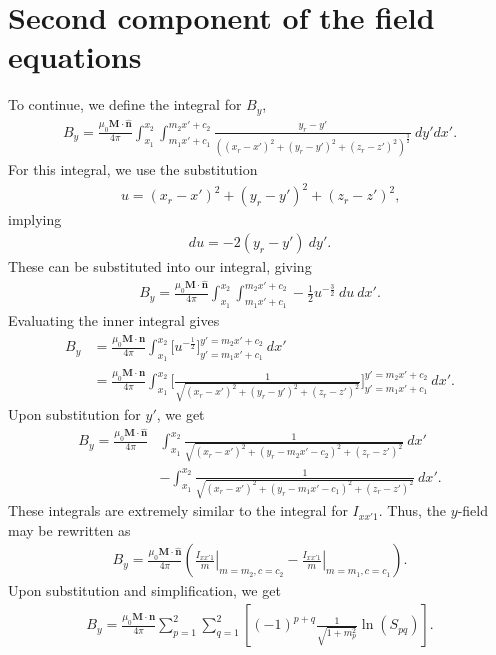 \section{Second component of the field equations}
To continue, we define the integral for \(B_y\),
\begin{align}
    B_y = \frac{\mu_0 \mathbf{M}\cdot\hat{\mathbf{n}}}{4\pi} \int_{x_1}^{x_2} \int_{m_1x'+c_1}^{m_2x'+c_2} \frac{y_r-y'}{\left(\left(x_r-x'\right)^2+\left(y_r-y'\right)^2+\left(z_r-z'\right)^2\right)^\frac{3}{2}}\ dy' dx' \text{.}
\end{align}
For this integral, we use the substitution
\begin{align}
    u = \left(x_r-x'\right)^2+\left(y_r-y'\right)^2+\left(z_r-z'\right)^2 \text{,}
\end{align}
implying
\begin{align}
    du = -2\left(y_r-y'\right)\ dy' \text{.}
\end{align}
These can be substituted into our integral, giving
\begin{align}
    B_y = \frac{\mu_0 \mathbf{M}\cdot\hat{\mathbf{n}}}{4\pi} \int_{x_1}^{x_2} \int_{m_1x'+c_1}^{m_2x'+c_2} -\frac{1}{2} u^{-\frac{3}{2}} \ du\ dx' \text{.}
\end{align}
Evaluating the inner integral gives
\begin{align}
    B_y &= \frac{\mu_0 \mathbf{M}\cdot\hat{\mathbf{n}}}{4\pi} \int_{x_1}^{x_2} \bigg[ u^{-\frac{1}{2}} \bigg]_{y'=m_1x'+c_1}^{y'=m_2x'+c_2}\ dx' \nonumber \\
    &= \frac{\mu_0 \mathbf{M}\cdot\hat{\mathbf{n}}}{4\pi} \int_{x_1}^{x_2} \bigg[ \frac{1}{\sqrt{\left(x_r-x'\right)^2+\left(y_r-y'\right)^2+\left(z_r-z'\right)^2}} \bigg]_{y'=m_1x'+c_1}^{y'=m_2x'+c_2}\ dx' \text{.}
\end{align}
Upon substitution for \(y'\), we get
\begin{align}
    B_y = \frac{\mu_0 \mathbf{M}\cdot\hat{\mathbf{n}}}{4\pi} &\int_{x_1}^{x_2} \frac{1}{\sqrt{\left(x_r-x'\right)^2+\left(y_r-m_2x'-c_2\right)^2+\left(z_r-z'\right)^2}}\ dx' \nonumber \\
    & - \int_{x_1}^{x_2} \frac{1}{\sqrt{\left(x_r-x'\right)^2+\left(y_r-m_1x'-c_1\right)^2+\left(z_r-z'\right)^2}}\ dx' \text{.}
\end{align}
These integrals are extremely similar to the integral for \(I_{xx'1}\). Thus, the \(y\)-field may be rewritten as
\begin{align}
    B_y = \frac{\mu_0 \mathbf{M}\cdot\hat{\mathbf{n}}}{4\pi} \left( \left. \frac{I_{xx'1}}{m} \right|_{m=m_2,c=c_2} - \left. \frac{I_{xx'1}}{m} \right|_{m=m_1,c=c_1} \right) \text{.}
\end{align}
Upon substitution and simplification, we get
\begin{align}
    B_y = \frac{\mu_0\mathbf{M}\cdot\hat{\mathbf{n}}}{4\pi} \sum_{p=1}^2 \sum_{q=1}^2 \left[ \left(-1\right)^{p+q} \frac{1}{\sqrt{1+m_p^2}} \ln \left(S_{pq} \right) \right] \text{.}
\end{align}

